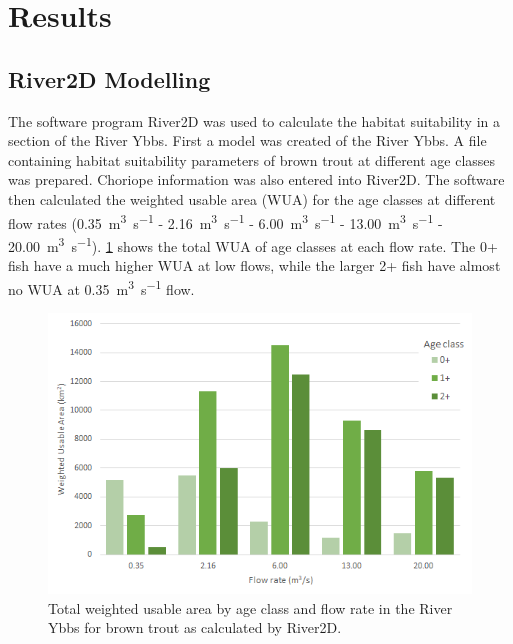 
\section{Results}\label{sec:results}                           %





\subsection{River2D Modelling}\label{sec:river2d}       




The software program River2D was used to calculate the habitat suitability in a section of the River Ybbs. First a model was created of the River Ybbs. A file containing habitat suitability parameters of brown trout at different age classes was prepared. Choriope information was also entered into River2D. The software then calculated the weighted usable area (WUA) for the age classes at different flow rates (\SI[per-mode=symbol]{0.35}{\cubic\meter\per\second} - \SI[per-mode=symbol]{2.16}{\cubic\meter\per\second} - \SI[per-mode=symbol]{6.00}{\cubic\meter\per\second} - \SI[per-mode=symbol]{13.00}{\cubic\meter\per\second} - \SI[per-mode=symbol]{20.00}{\cubic\meter\per\second}). \cref{fig:flow_rate_age_class} shows the total WUA of age classes at each flow rate. The 0+ fish have a much higher WUA at low flows, while the larger 2+ fish have almost no WUA at \SI[per-mode=symbol]{0.35}{\cubic\meter\per\second} flow.


\begin{figure}[!htb] 
	\centering
	\includegraphics[width=.8\textwidth]{images/flow_rate_age_class}
	\caption{Total weighted usable area by age class and flow rate in the River Ybbs for brown trout as calculated by River2D.}\label{fig:flow_rate_age_class}
\end{figure}

